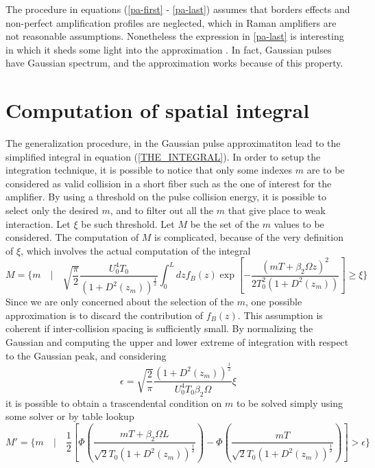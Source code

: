\documentclass[10pt, lettersize, journal, onecolumn]{IEEEtran}
\begin{document}
The procedure in equations (\ref{pa-first} - \ref{pa-last}) assumes that borders effects and non-perfect amplification profiles are neglected, which in Raman amplifiers are not reasonable assumptions. Nonetheless the expression in \ref{pa-last} is interesting in which it sheds some light into the approximation \cite[eq. 10]{Dar_2013}. In fact, Gaussian pulses have Gaussian spectrum, and the approximation works because of this property.

\section{Computation of spatial integral}
The generalization procedure, in the Gaussian pulse approximatiton lead to the simplified integral in equation (\ref{THE_INTEGRAL}). In order to setup the integration technique, it is possible to notice that only some indexes $m$ are to be considered as valid collision in a short fiber such as the one of interest for the amplifier. By using a threshold on the pulse collision energy, it is possible to select only the desired $m$, and to filter out all the $m$ that give place to weak interaction. Let $\xi$ be such threshold. Let $M$ be the set of the $m$ values to be considered. The computation of $M$ is complicated, because of the very definition of $\xi$, which involves the actual computation of the integral
\begin{equation}
	M = \bigg\{ m \quad \bigg| \quad \sqrt{\dfrac{\pi}{2}}\dfrac{U_0^4 T_0}{(1+D^2(z_m))^{\frac{1}{2}}} \int_{0}^{L} dz f_B(z) \exp\left[-\dfrac{(mT+\beta_2\Omega z)^2}{2T_0^2(1+D^2(z_m))} \right] \geq \xi \bigg\}
\end{equation}
Since we are only concerned about the selection of the $m$, one possible approximation is to discard the contribution of $f_B(z)$. This assumption is coherent if inter-collision spacing is sufficiently small.
By normalizing the Gaussian and computing the upper and lower extreme of integration with respect to the Gaussian peak, and considering 
\begin{equation}
	\epsilon = \sqrt{\dfrac{2}{\pi}} \dfrac{(1+D^2(z_m))^\frac{1}{2}}{U_0^4 T_0 \beta_2 \Omega} \xi
\end{equation}
it is possible to obtain a trascendental condition on $m$ to be solved simply using some solver or by table lookup
\begin{equation}
	M' = \bigg\{ m  \quad \bigg| \quad \dfrac{1}{2} \left[\Phi \left(\dfrac{mT + \beta_2 \Omega L}{\sqrt{2} T_0 (1+D^2(z_m))^\frac{1}{2} }\right) - \Phi\left(\dfrac{mT}{\sqrt{2} T_0 (1+D^2(z_m))^\frac{1}{2} } \right) \right] > \epsilon \bigg\}
\end{equation}
\end{document}
